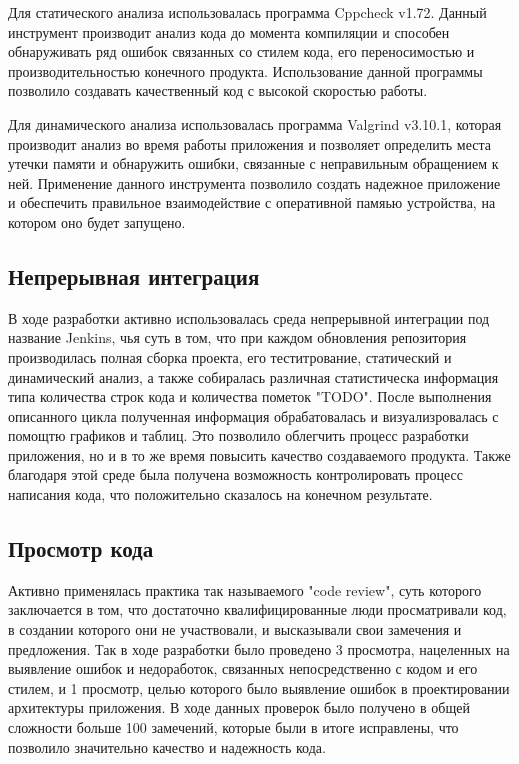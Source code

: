 Для статического анализа использовалась программа Cppcheck v1.72. Данный инструмент производит анализ кода до момента компиляции и способен обнаруживать ряд ошибок связанных со стилем кода, его переносимостью и производительностью конечного продукта. Использование данной программы позволило создавать качественный код с высокой скоростью работы.

Для динамического анализа использовалась программа Valgrind v3.10.1, которая производит анализ во время работы приложения и позволяет определить места утечки памяти и обнаружить ошибки, связанные с неправильным обращением к ней. Применение данного инструмента позволило создать надежное приложение и обеспечить правильное взаимодействие с оперативной памяью устройства, на котором оно будет запущено.

\subsection{Непрерывная интеграция}

В ходе разработки активно использовалась среда непрерывной интеграции под название Jenkins, чья суть в том, что при каждом обновления репозитория производилась полная сборка проекта, его теститрование, статический и динамический анализ, а также собиралась различная статистическа информация типа количества строк кода и количества пометок "TODO". После выполнения описанного цикла полученная информация обрабатовалась и визуализровалась с помощтю графиков и таблиц. Это позволило облегчить процесс разработки приложения, но и в то же время повысить качество создаваемого продукта. Также благодаря этой среде была получена возможность контролировать процесс написания кода, что положительно сказалось на конечном результате.

\subsection{Просмотр кода}

Активно применялась практика так называемого "code review", суть которого заключается в том, что достаточно квалифицированные люди просматривали код, в создании которого они не участвовали, и высказывали свои замечения и предложения. Так в ходе разработки было проведено 3 просмотра, нацеленных на выявление ошибок и недоработок, связанных  непосредственно с кодом и его стилем, и 1 просмотр, целью которого было выявление ошибок в проектировании архитектуры приложения. В ходе данных проверок было получено в общей сложности больше 100 замечений, которые были в итоге исправлены, что позволило значительно качество и надежность кода.   

